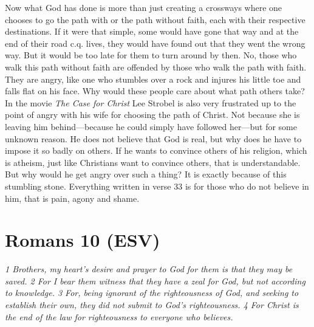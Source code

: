 Now what God has done is more than just creating a crossways where one
chooses to go the path with or the path without faith, each with their
respective destinations. If it were that simple, some would have gone
that way and at the end of their road c.q. lives, they would have found
out that they went the wrong way. But it would be too late for them to
turn around by then. No, those who walk this path without faith are
offended by those who walk the path with faith. They are angry, like one
who stumbles over a rock and injures his little toe and falls flat on
his face. Why would these people care about what path others take? In
the movie \emph{The Case for Christ} Lee Strobel is also very frustrated
up to the point of angry with his wife for choosing the path of Christ.
Not because she is leaving him behind---because he could simply have
followed her---but for some unknown reason. He does not believe that God
is real, but why does he have to impose it so badly on others. If he
wants to convince others of his religion, which is atheism, just like
Christians want to convince others, that is understandable. But why
would he get angry over such a thing? It is exactly because of this
stumbling stone. Everything written in verse 33 is for those who do not
believe in him, that is pain, agony and shame.

\hypertarget{romans-10-esv}{%
\section{Romans 10 (ESV)}\label{romans-10-esv}}
\vspace{10.5cm}
\emph{1 Brothers, my heart's desire and prayer to God for them is that
they may be saved. 2 For I bear them witness that they have a zeal for
God, but not according to knowledge. 3 For, being ignorant of the
righteousness of God, and seeking to establish their own, they did not
submit to God's righteousness. 4 For Christ is the end of the law for
righteousness to everyone who believes.}

